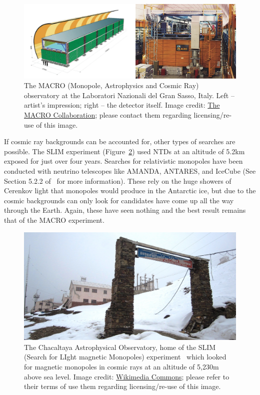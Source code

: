 %
\begin{figure}[htbp]
  \centering
  \includegraphics[width=1.0\textwidth]{assets/images/macro/macro.jpg}
  \caption[The MACRO experiment]
  {\label{fig:macro}The \acs{MACRO} (Monopole, Astrophysics and Cosmic Ray) %
observatory at the Laboratori Nazionali del Gran Sasso, Italy. %
Left -- artist's impression; %
right -- the detector itself. %
Image credit: \href{http://arxiv.org/abs/0707.1691}{The MACRO Collaboration}; %
please contact them regarding licensing/re-use of this image.}
\end{figure}
%

If cosmic ray backgrounds can be accounted for, other types of searches 
are possible.  The \ac{SLIM} experiment (Figure~\ref{fig:slim}) used
\acp{NTD} at an altitude of 5.2km exposed for just over four years.
Searches for relativistic monopoles have been conducted with neutrino 
telescopes like \acs{AMANDA}, \acs{ANTARES}, and IceCube 
(See Section 5.2.2 of~\cite{Patrizii2015} for more information).
These rely on the huge showers of Cerenkov light that monopoles would 
produce in the Antarctic ice, but due to the cosmic backgrounds can only 
look for candidates have come up all the way through the Earth.  
Again, these have seen nothing and the best result remains that of the 
\ac{MACRO} experiment.

%
\begin{figure}[htbp]
  \centering
  \includegraphics[width=1.0\textwidth]{assets/images/slim/slim.jpg}
  \caption[The Chacaltaya Astrophysical Observatory]
  {\label{fig:slim}The Chacaltaya Astrophysical Observatory, home of the %
\acs{SLIM} (Search for LIght magnetic Monopoles) experiment~\cite{SLIM2008a, SLIM2008b} %
which looked for magnetic monopoles in cosmic rays at an altitude of 5,230m above sea level. %
Image credit: \href{https://commons.wikimedia.org/wiki/File:Chacaltaya\_Astrophysical\_Observatory\_\%2804\%29.JPG}{Wikimedia Commons}; %
please refer to their terms of use them regarding licensing/re-use of this image.}
\end{figure}
%


